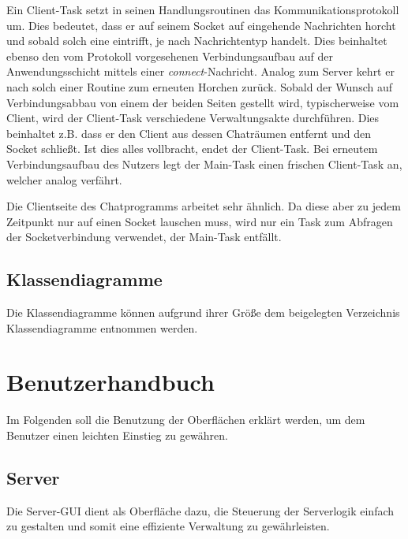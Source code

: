 \documentclass[12pt,a4paper,bibliography=totocnumbered,listof=totocnumbered]{scrartcl}
\begin{document}
Ein Client-Task setzt in seinen Handlungsroutinen das Kommunikationsprotokoll um. Dies bedeutet, dass er auf seinem Socket auf eingehende Nachrichten horcht und sobald solch eine eintrifft, je nach Nachrichtentyp handelt. Dies beinhaltet ebenso den vom Protokoll vorgesehenen Verbindungsaufbau auf der Anwendungsschicht mittels einer \textit{connect}-Nachricht. Analog zum Server kehrt er nach solch einer Routine zum erneuten Horchen zurück. Sobald der Wunsch auf Verbindungsabbau von einem der beiden Seiten gestellt wird, typischerweise vom Client, wird der Client-Task verschiedene Verwaltungsakte durchführen. Dies beinhaltet z.B. dass er den Client aus dessen Chaträumen entfernt und den Socket schließt. Ist dies alles vollbracht, endet der Client-Task. Bei erneutem Verbindungsaufbau des Nutzers legt der Main-Task einen frischen Client-Task an, welcher analog verfährt.

Die Clientseite des Chatprogramms arbeitet sehr ähnlich. Da diese aber zu jedem Zeitpunkt nur auf einen Socket lauschen muss, wird nur ein Task zum Abfragen der Socketverbindung verwendet, der Main-Task entfällt.

\subsection{Klassendiagramme}
Die Klassendiagramme können aufgrund ihrer Größe dem beigelegten Verzeichnis 
\glqq Klassendiagramme\grqq{} entnommen werden.


\newpage
\section{Benutzerhandbuch}
Im Folgenden soll die Benutzung der Oberflächen erklärt werden, um dem Benutzer einen leichten Einstieg zu gewähren.
\subsection{Server}
Die Server-GUI dient als Oberfläche dazu, die Steuerung der Serverlogik einfach zu gestalten und somit eine effiziente Verwaltung zu gewährleisten.
\end{document}
